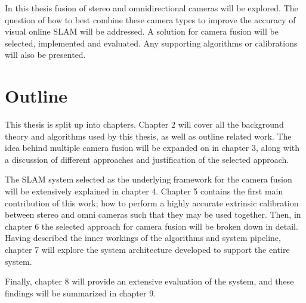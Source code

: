 In this thesis fusion of stereo and omnidirectional cameras will be explored.  The question of how to best combine these camera types to improve the accuracy of visual online SLAM will be addressed.  A solution for camera fusion will be selected, implemented and evaluated.  Any supporting algorithms or calibrations will also be presented.

\section{Outline}

This thesis is split up into chapters.  Chapter 2 will cover all the background theory and  algorithms used by this thesis, as well as outline related work.  The idea behind multiple camera fusion will be expanded on in chapter 3, along with a discussion of different approaches and justification of the selected approach. 

The SLAM system selected as the underlying framework for the camera fusion will be extensively explained in chapter 4.  Chapter 5 contains the first main contribution of this work; how to perform a highly accurate extrinsic calibration between stereo and omni cameras such that they may be used together.  Then, in chapter 6 the selected approach for camera fusion will be broken down in detail.  Having described the inner workings of the algorithms and system pipeline, chapter 7 will explore the system architecture developed to support the entire system.

Finally, chapter 8 will provide an extensive evaluation of the system, and these findings will be summarized in chapter 9.